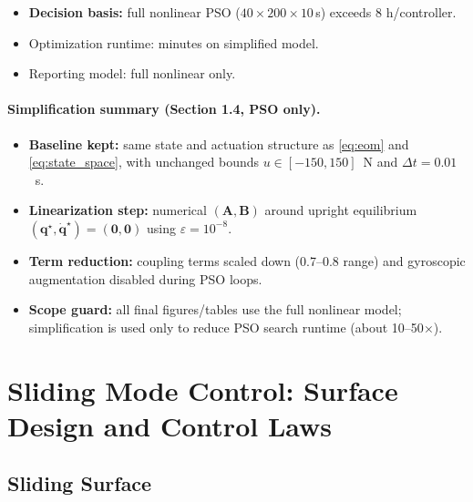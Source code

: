 \documentclass[10pt, a4paper]{article}
\newcommand{\vq}{\boldsymbol{q}}
\begin{document}
\begin{itemize}[leftmargin=1.5em,itemsep=0.2em]
  \item \textbf{Decision basis:} full nonlinear PSO
  ($40\times200\times10$\,s) exceeds 8 h/controller.
  \item Optimization runtime: minutes on simplified model.
  \item Reporting model: full nonlinear only.
\end{itemize}

\paragraph{Simplification summary (Section 1.4, PSO only).}
\begin{itemize}[leftmargin=1.5em,itemsep=0.2em]
  \item \textbf{Baseline kept:} same state and actuation structure as
  \eqref{eq:eom} and \eqref{eq:state_space}, with unchanged bounds
  $u\in[-150,150]$~N and $\Delta t=0.01$~s.
  \item \textbf{Linearization step:} numerical $(\mathbf{A},\mathbf{B})$
  around upright equilibrium $(\vq^\star,\dot{\vq}^\star)=(\mathbf{0},\mathbf{0})$
  using $\varepsilon=10^{-8}$.
  \item \textbf{Term reduction:} coupling terms scaled down (0.7--0.8 range)
  and gyroscopic augmentation disabled during PSO loops.
  \item \textbf{Scope guard:} all final figures/tables use the full nonlinear model;
  simplification is used only to reduce PSO search runtime (about 10--50$\times$).
\end{itemize}

\section{Sliding Mode Control: Surface Design and Control Laws}

\subsection{Sliding Surface}
\end{document}
